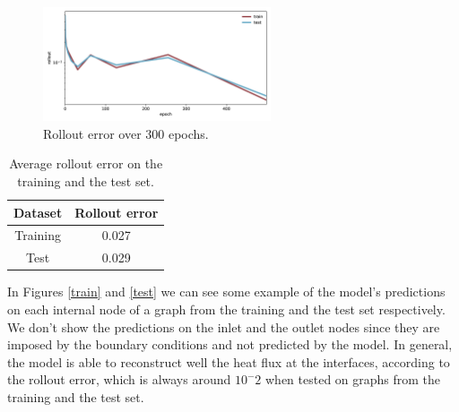 \documentclass[11pt,a4paper]{article}
\begin{document}
\begin{figure}[H]
    \centering
    \includegraphics[width=0.6\textwidth]{Images/rollout.jpg}
    \caption{Rollout error over 300 epochs.}
    \label{rollout_plot}
\end{figure}

\begin{table}[H]
    \centering
    \begin{tabular}{|c|c|}
        \hline
        \textbf{Dataset} & \textbf{Rollout error} \\
        \hline
        Training & 0.027 \\
        Test & 0.029 \\
        \hline
    \end{tabular}
    \caption{Average rollout error on the training and the test set.}
    \label{errors}
\end{table}

In Figures \ref{train} and \ref{test} we can see some example of the model's predictions on each internal node of a graph from the training and the test set respectively. We don't show the predictions on the inlet and the outlet nodes since they are imposed by the boundary conditions and not predicted by the model.
In general, the model is able to reconstruct well the heat flux at the interfaces, according to the rollout error, which is always around \(10^-2\) when tested on graphs from the training and the test set. 
\end{document}
